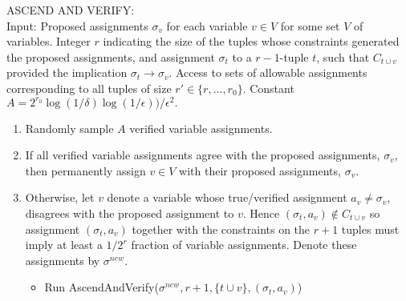 \documentclass[final,12pt]{colt2018}
\newcommand{\eps}{\epsilon}
\begin{document}
\vspace{-.4cm}\begin{algorithm}[H]
ASCEND AND VERIFY:\\
Input: Proposed assignments $\sigma_v$ for each variable $v \in V$ for some set $V$ of variables.  Integer $r$ indicating the size of the tuples whose constraints generated the proposed assignments, and assignment $\sigma_t$ to a $r-1$-tuple $t$, such that $C_{t \cup v}$ provided the implication $\sigma_t \rightarrow \sigma_v$.  Access to sets of allowable assignments corresponding to all tuples of size $r' \in \{r,\ldots,r_0\}$.  Constant $A = 2^{r_0}\log (1/\delta)\log(1/\eps))/\eps^2.$
\begin{enumerate}
\vspace{-.2cm}\item Randomly sample $A$ verified variable assignments.
\vspace{-.2cm}\item If all verified variable assignments agree with the proposed assignments, $\sigma_v$, then permanently assign $v\in V$ with their proposed assignments, $\sigma_v$.
\vspace{-.2cm}\item Otherwise, let $v$ denote a variable whose true/verified assignment $a_v \neq \sigma_v$, disagrees with the proposed assignment to $v$.  Hence $(\sigma_t,a_v) \not \in C_{t \cup v}$ so assignment $(\sigma_t,a_v)$ together with the constraints on the $r+1$ tuples must imply at least a $1/2^r$ fraction of variable assignments.  Denote these assignments by $\sigma^{new}$.
\begin{itemize}
\item Run  AscendAndVerify($\sigma^{new}, r+1,\{t \cup v\},(\sigma_t,a_v)$)
\end{itemize}
\end{enumerate}
\end{algorithm}
\end{document}
